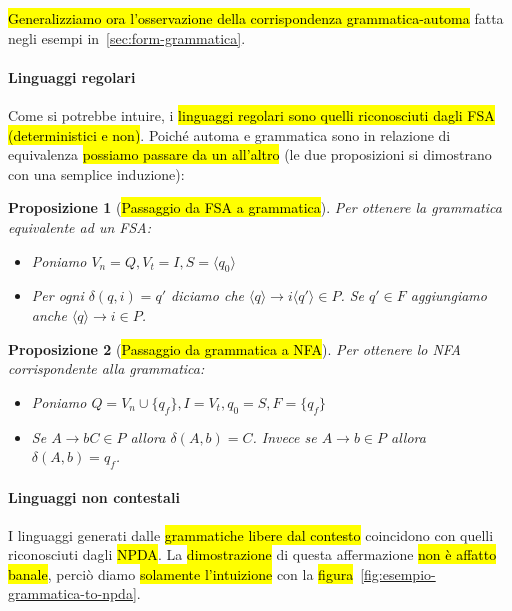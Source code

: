\documentclass[a4paper,11pt,oneside]{article}
\theoremstyle{plain}
\newtheorem{prop}{Proposizione}[section]
\theoremstyle{definition}
\theoremstyle{remark}
\begin{document}
\hl{Generalizziamo ora l'osservazione della corrispondenza grammatica-automa}
fatta negli esempi in~\ref{sec:form-grammatica}.

\paragraph{Linguaggi regolari} Come si potrebbe intuire, i \hl{linguaggi
regolari sono quelli riconosciuti dagli FSA (deterministici e non)}. Poiché
automa e grammatica sono in relazione di equivalenza \hl{possiamo passare da un
all'altro} (le due proposizioni si dimostrano con una semplice induzione):

\begin{prop}[\hl{Passaggio da FSA a grammatica}]
  Per ottenere la grammatica equivalente ad un FSA\@:

  \begin{itemize}
    \item Poniamo $V_n = Q, V_t = I, S = \langle q_0 \rangle$
    \item Per ogni $\delta(q, i) = q'$ diciamo che $\langle q \rangle \to i
      \langle q' \rangle \in P $. Se $q' \in F$ aggiungiamo anche $\langle q
      \rangle \to  i \in P$.
  \end{itemize}
\end{prop}

\begin{prop}[\hl{Passaggio da grammatica a NFA}]
  Per ottenere lo NFA corrispondente alla grammatica:

  \begin{itemize}
    \item Poniamo $Q = V_n \cup \{q_f\}, I = V_t, q_0 = S, F = \{q_f\} $
    \item Se $A \to bC \in P$ allora $\delta(A,b) = C$. Invece se $A \to b \in
      P$ allora $\delta(A, b) = q_f$.
  \end{itemize}
\end{prop}

\paragraph{Linguaggi non contestali} I linguaggi generati dalle \hl{grammatiche
libere dal contesto} coincidono con quelli riconosciuti dagli \hl{NPDA}\@. La
\hl{dimostrazione} di questa affermazione \hl{non è affatto banale}, perciò
diamo \hl{solamente l'intuizione} con la
\hl{figura}~\ref{fig:esempio-grammatica-to-npda}.
\end{document}
